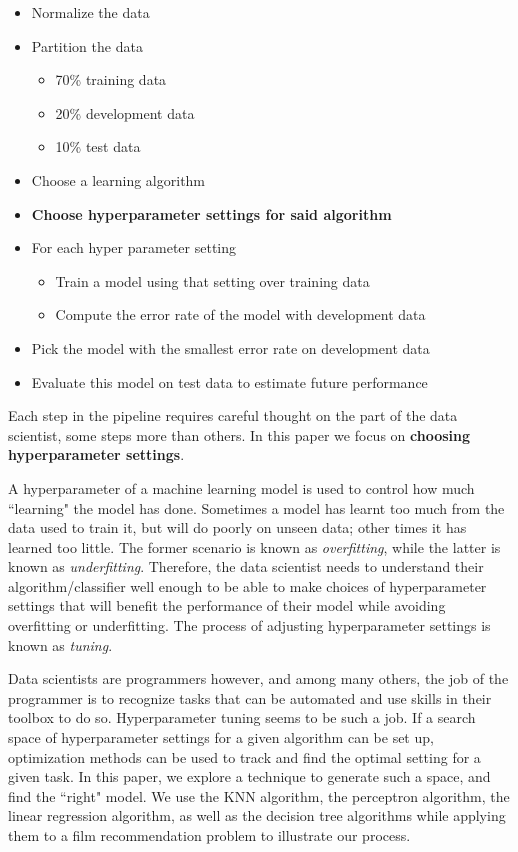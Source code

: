 \documentclass{cup-ino}
\begin{document}
\begin{itemize}
    \item Normalize the data
    \item Partition the data 
    \begin{itemize}
        \item 70\% training data \item 20\% development data 
        \item 10\% test data
    \end{itemize}
    \item Choose a learning algorithm
    \item \textbf{Choose hyperparameter settings for said algorithm}
    \item For each hyper parameter setting
    \begin{itemize}
        \item Train a model using that setting over training data
        \item Compute the error rate of the model with development data
    \end{itemize}
    \item Pick the model with the smallest error rate on development data
    \item Evaluate this model on test data to estimate future performance
\end{itemize}
Each step in the pipeline requires careful thought on the part of the data scientist, some steps more than others. In this paper we focus on \textbf{choosing hyperparameter settings}.

A hyperparameter of a machine learning model is used to control how much ``learning" the model has done. Sometimes a model has learnt too much from the data used to train it, but will do poorly on unseen data; other times it has learned too little. The former scenario is known as \textit{overfitting}, while the latter is known as \textit{underfitting}. Therefore, the data scientist needs to understand their algorithm/classifier well enough to be able to make choices of hyperparameter settings that will benefit the performance of their model while avoiding overfitting or underfitting. The process of adjusting hyperparameter settings is known as \textit{tuning}.

Data scientists are programmers however, and among many others, the job of the programmer is to recognize tasks that can be automated and use skills in their toolbox to do so. Hyperparameter tuning seems to be such a job. If a search space of hyperparameter settings for a given algorithm can be set up, optimization methods can be used to track and find the optimal setting for a given task. In this paper, we explore a technique to generate such a space, and find the ``right" model. We use the KNN algorithm, the perceptron algorithm, the linear regression algorithm, as well as the decision tree algorithms while applying them to a film recommendation problem to illustrate our process.
\end{document}
